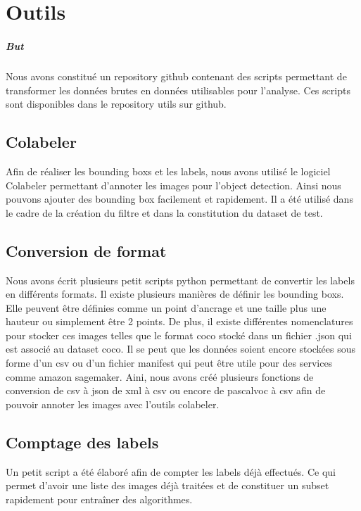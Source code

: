 \chapter{Outils}

\paragraph*{But}

Nous avons constitué un repository github contenant des scripts permettant de transformer les données brutes en données utilisables pour l'analyse. Ces scripts sont disponibles dans le repository utils sur github.

\section{Colabeler}

Afin de réaliser les bounding boxs et les labels, nous avons utilisé le logiciel Colabeler permettant d'annoter les images pour l'object detection. Ainsi nous pouvons ajouter des bounding box facilement et rapidement. Il a été utilisé dans le cadre de la création du filtre et dans la constitution du dataset de test.

\section{Conversion de format}

Nous avons écrit plusieurs petit scripts python permettant de convertir les labels en différents formats. Il existe plusieurs manières de définir les bounding boxs. Elle peuvent être définies comme un point d'ancrage et une taille plus une hauteur ou simplement être 2 points. De plus, il existe différentes nomenclatures pour stocker ces images telles que le format coco stocké dans un fichier .json qui est associé au dataset coco. Il se peut que les données soient encore stockées sous forme d'un csv ou d'un fichier manifest qui peut être utile pour des services comme amazon sagemaker. Aini, nous avons créé plusieurs fonctions de conversion de csv à json de xml à csv ou encore de pascalvoc à csv afin de pouvoir annoter les images avec l'outils colabeler.

\section{Comptage des labels}

Un petit script a été élaboré afin de compter les labels déjà effectués. Ce qui permet d'avoir une liste des images déjà traitées et de constituer un subset rapidement pour entraîner des algorithmes.

